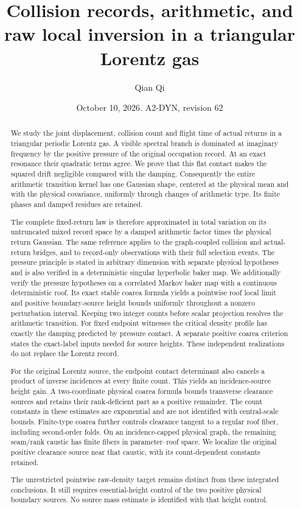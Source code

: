 \documentclass[11pt,reqno]{amsart}
\title[Collision records and raw local inversion]{Collision records, arithmetic, and raw local inversion in a triangular Lorentz gas}
\author{Qian Qi}
\date{October 10, 2026. A2-DYN, revision 62}
\numberwithin{equation}{section}
\theoremstyle{definition}\newtheorem{definition}[theorem]{Definition}
\theoremstyle{remark}\newtheorem{remark}[theorem]{Remark}
\begin{document}
\raggedbottom
\begin{abstract}
We study the joint displacement, collision count and flight time of
actual returns in a triangular periodic Lorentz gas. A visible spectral
branch is dominated at imaginary frequency by the positive pressure
of the original occupation record. At an exact resonance their
quadratic terms agree. We prove that this flat contact makes the
squared drift negligible compared with the damping. Consequently the
entire arithmetic transition kernel has one Gaussian shape, centered
at the physical mean and with the physical covariance, uniformly
through changes of arithmetic type. Its finite phases and damped
residues are retained.

The complete fixed-return law is therefore approximated in total
variation on its untruncated mixed record space by a damped arithmetic
factor times the physical return Gaussian. The same reference applies
to the graph-coupled collision and actual-return bridges, and to
record-only observations with their full selection events. The pressure
principle is stated in arbitrary dimension with separate physical
hypotheses and is also verified in a deterministic singular hyperbolic
baker map. We additionally verify the pressure hypotheses on a
correlated Markov baker map with a continuous deterministic roof. Its
exact stable coarea formula yields a pointwise roof local limit and
positive boundary-source height bounds uniformly throughout a nonzero
perturbation interval. Keeping two integer counts before scalar projection
resolves the arithmetic transition. For fixed endpoint witnesses the
critical density profile has exactly the damping predicted by pressure
contact. A separate positive coarea criterion states the exact-label
inputs needed for source heights. These independent realizations
do not replace the Lorentz record.

For the original Lorentz source, the endpoint contact determinant also
cancels a product of inverse incidences at every finite count. This yields
an incidence-source height gain. A two-coordinate physical coarea formula
bounds transverse clearance sources and retains their rank-deficient
part as a positive remainder. The count constants in these estimates
are exponential and are not identified with central-scale bounds.
Finite-type coarea further controls clearance tangent to a regular
roof fiber, including second-order folds. On an incidence-capped
physical graph, the remaining seam/rank caustic has finite fibers in
parameter--roof space. We localize the original positive clearance
source near that caustic, with its count-dependent constants retained.

The unrestricted pointwise raw-density target remains distinct from
these integrated conclusions. It still requires essential-height
control of the two positive physical boundary sources. No source
mass estimate is identified with that height control.
\end{abstract}
\maketitle
\end{document}
